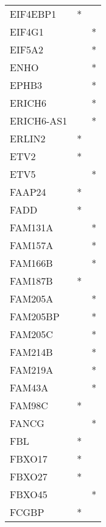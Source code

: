 \begin{longtable}{lcc}
EIF4EBP1         &              * &            \\
EIF4G1           &                &          * \\
EIF5A2           &                &          * \\
ENHO             &                &          * \\
EPHB3            &                &          * \\
ERICH6           &                &          * \\
ERICH6-AS1       &                &          * \\
ERLIN2           &              * &            \\
ETV2             &              * &            \\
ETV5             &                &          * \\
FAAP24           &              * &            \\
FADD             &              * &            \\
FAM131A          &                &          * \\
FAM157A          &                &          * \\
FAM166B          &                &          * \\
FAM187B          &              * &            \\
FAM205A          &                &          * \\
FAM205BP         &                &          * \\
FAM205C          &                &          * \\
FAM214B          &                &          * \\
FAM219A          &                &          * \\
FAM43A           &                &          * \\
FAM98C           &              * &            \\
FANCG            &                &          * \\
FBL              &              * &            \\
FBXO17           &              * &            \\
FBXO27           &              * &            \\
FBXO45           &                &          * \\
FCGBP            &              * &            \\

\end{longtable}
